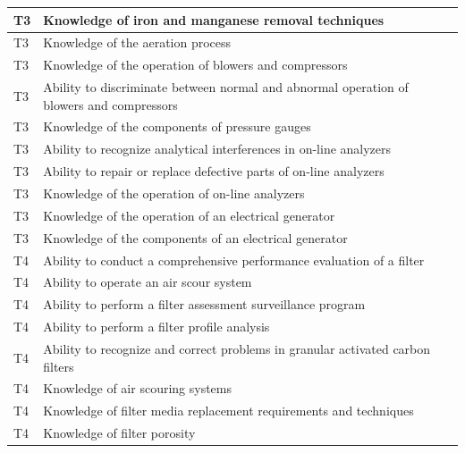 \begin{table}[H]
\begin{tabular}{| m{1cm} |m{15cm} |}
T3 & Knowledge of iron and   manganese removal techniques                                       \\ \hline
T3 & Knowledge of the   aeration process                                                        \\ \hline
T3 & Knowledge of the   operation of blowers and compressors                                    \\ \hline
T3 & Ability to   discriminate between normal and abnormal operation of blowers and compressors \\ \hline
T3 & Knowledge of the   components of pressure gauges                                           \\ \hline
T3 & Ability to recognize   analytical interferences in on-line analyzers                       \\ \hline
T3 & Ability to repair or   replace defective parts of on-line analyzers                        \\ \hline
T3 & Knowledge of the   operation of on-line analyzers                                          \\ \hline
T3 & Knowledge of the   operation of an electrical generator                                    \\ \hline
T3 & Knowledge of the   components of an electrical generator                                   \\ \hline
T4 & Ability to conduct a   comprehensive performance evaluation of a filter                    \\ \hline
T4 & Ability to operate an   air scour system                                                   \\ \hline
T4 & Ability to perform a   filter assessment surveillance program                              \\ \hline
T4 & Ability to perform a   filter profile analysis                                             \\ \hline
T4 & Ability to recognize   and correct problems in granular activated carbon filters           \\ \hline
T4 & Knowledge of air   scouring systems                                                        \\ \hline
T4 & Knowledge of filter   media replacement requirements and techniques                        \\ \hline
T4 & Knowledge of filter   porosity                                                             \\ \hline

\end{tabular}
\end{table}
